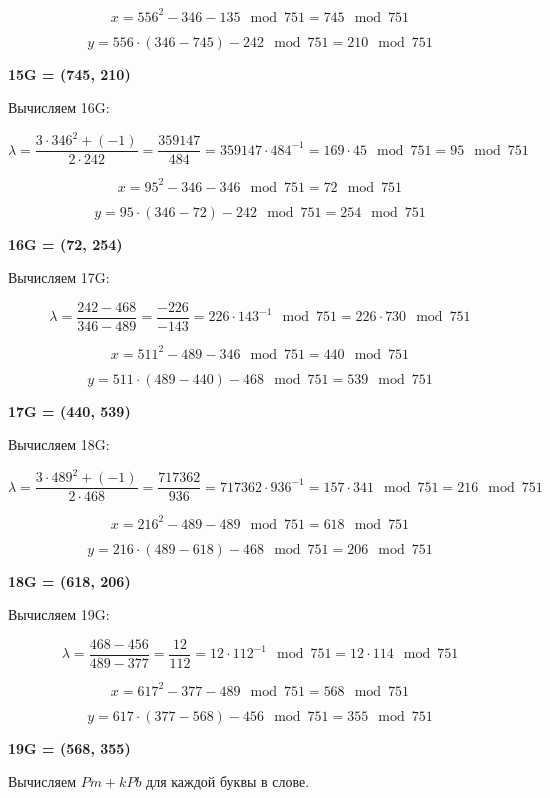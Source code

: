         \[
        x = 556^2 - 346 - 135 \mod{751} = 745\mod{751}
        \]
        

        \[
        y = 556 \cdot (346 - 745) - 242\mod{751} = 210\mod{751}
        \]
        
\textbf{15G = (745, 210)}

Вычисляем 16G:

            \[
            \lambda = \frac{ 3 \cdot 346^2 + (-1) }{2 \cdot 242} = \frac{359147}{484} = 359147 \cdot 484^{-1} = 169 \cdot 45\mod{751} = 95\mod{751}
            \]
            

        \[
        x = 95^2 - 346 - 346 \mod{751} = 72\mod{751}
        \]
        

        \[
        y = 95 \cdot (346 - 72) - 242\mod{751} = 254\mod{751}
        \]
        
\textbf{16G = (72, 254)}

Вычисляем 17G:

            \[
            \lambda = \frac{242-468}{346-489} = \frac{-226}{-143} = 226 \cdot 143^{-1}\mod{751} = 226 \cdot 730\mod{751}
            \]
            

        \[
        x = 511^2 - 489 - 346 \mod{751} = 440\mod{751}
        \]
        

        \[
        y = 511 \cdot (489 - 440) - 468\mod{751} = 539\mod{751}
        \]
        
\textbf{17G = (440, 539)}

Вычисляем 18G:

            \[
            \lambda = \frac{ 3 \cdot 489^2 + (-1) }{2 \cdot 468} = \frac{717362}{936} = 717362 \cdot 936^{-1} = 157 \cdot 341\mod{751} = 216\mod{751}
            \]
            

        \[
        x = 216^2 - 489 - 489 \mod{751} = 618\mod{751}
        \]
        

        \[
        y = 216 \cdot (489 - 618) - 468\mod{751} = 206\mod{751}
        \]
        
\textbf{18G = (618, 206)}

Вычисляем 19G:

            \[
            \lambda = \frac{468-456}{489-377} = \frac{12}{112} = 12 \cdot 112^{-1}\mod{751} = 12 \cdot 114\mod{751}
            \]
            

        \[
        x = 617^2 - 377 - 489 \mod{751} = 568\mod{751}
        \]
        

        \[
        y = 617 \cdot (377 - 568) - 456\mod{751} = 355\mod{751}
        \]
        
\textbf{19G = (568, 355)}

 Вычисляем $Pm+kPb$ для каждой буквы в слове.
